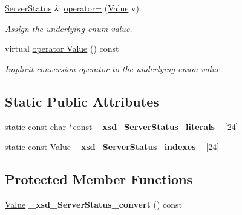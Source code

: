 \begin{DoxyCompactItemize}
\hyperlink{classopenstack_1_1xml_1_1ServerStatus}{ServerStatus} \& \hyperlink{classopenstack_1_1xml_1_1ServerStatus_ac881af2ed65929f49312dd9f1004be1c}{operator=} (\hyperlink{classopenstack_1_1xml_1_1ServerStatus_a086acdc13b219f6cb6547ec0d7783cb2}{Value} v)
\begin{DoxyCompactList}\small\item\em Assign the underlying enum value. \item\end{DoxyCompactList}\item 
virtual \hyperlink{classopenstack_1_1xml_1_1ServerStatus_ac4ca449729ecfbecad88668ca57b7d52}{operator Value} () const 
\begin{DoxyCompactList}\small\item\em Implicit conversion operator to the underlying enum value. \item\end{DoxyCompactList}\end{DoxyCompactItemize}
\subsection*{Static Public Attributes}
\begin{DoxyCompactItemize}
\item 
\hypertarget{classopenstack_1_1xml_1_1ServerStatus_a5abc6edd3d941cf93c59c3288c910f28}{
static const char $\ast$const {\bfseries \_\-xsd\_\-ServerStatus\_\-literals\_\-} \mbox{[}24\mbox{]}}
\label{classopenstack_1_1xml_1_1ServerStatus_a5abc6edd3d941cf93c59c3288c910f28}

\item 
\hypertarget{classopenstack_1_1xml_1_1ServerStatus_a7b1aaceca8db5f39e298ef45d957536c}{
static const \hyperlink{classopenstack_1_1xml_1_1ServerStatus_a086acdc13b219f6cb6547ec0d7783cb2}{Value} {\bfseries \_\-xsd\_\-ServerStatus\_\-indexes\_\-} \mbox{[}24\mbox{]}}
\label{classopenstack_1_1xml_1_1ServerStatus_a7b1aaceca8db5f39e298ef45d957536c}

\end{DoxyCompactItemize}
\subsection*{Protected Member Functions}
\begin{DoxyCompactItemize}
\item 
\hypertarget{classopenstack_1_1xml_1_1ServerStatus_a566d7cbb56bde5d8f7f9fa1089213d9a}{
\hyperlink{classopenstack_1_1xml_1_1ServerStatus_a086acdc13b219f6cb6547ec0d7783cb2}{Value} {\bfseries \_\-xsd\_\-ServerStatus\_\-convert} () const }
\label{classopenstack_1_1xml_1_1ServerStatus_a566d7cbb56bde5d8f7f9fa1089213d9a}

\end{DoxyCompactItemize}


